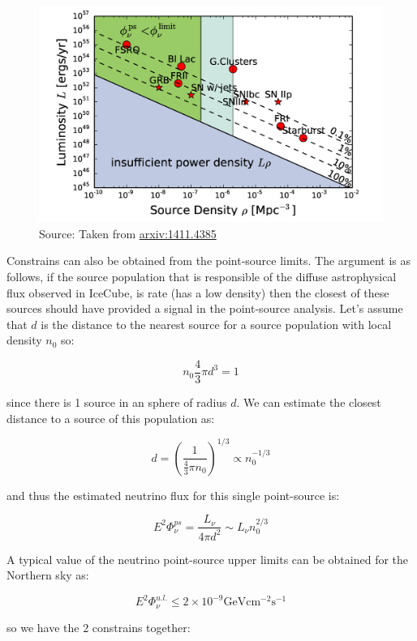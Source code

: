 \documentclass[
  letterpaper,
  DIV=11,
  numbers=noendperiod]{scrreprt}
\begin{document}
\begin{figure}[H]

{\centering \includegraphics{images/kowalski2.png}

}

\caption{Source: Taken from
\href{https://arxiv.org/pdf/1411.4385.pdf}{arxiv:1411.4385}}

\end{figure}%

Constrains can also be obtained from the point-source limits. The
argument is as follows, if the source population that is responsible of
the diffuse astrophysical flux observed in IceCube, is rate (has a low
density) then the closest of these sources should have provided a signal
in the point-source analysis. Let's assume that \(d\) is the distance to
the nearest source for a source population with local density \(n_0\)
so:

\[n_0 \frac{4}{3} \pi d^3 = 1\]

since there is 1 source in an sphere of radius \(d\). We can estimate
the closest distance to a source of this population as:

\[ d = \left(\frac{1}{\frac{4}{3}\pi n_0}\right)^{1/3} \propto n_0^{-1/3}\]

and thus the estimated neutrino flux for this single point-source is:

\[E^2 \Phi^{ps}_\nu = \frac{L_\nu}{4\pi d^2} \sim L_\nu n_0^{2/3}\]

A typical value of the neutrino point-source upper limits can be
obtained for the Northern sky as:

\[E^2 \Phi^{u.l.}_\nu \leq 2 \times 10^{-9} \mathrm{ GeV} \mathrm{ cm}^{-2}\mathrm{ s}^{-1} \]

so we have the 2 constrains together:
\end{document}

